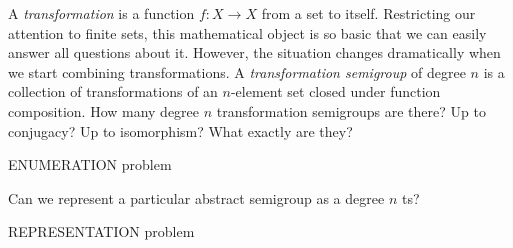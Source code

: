\documentclass{amsart}
\begin{document}
A \emph{transformation} is a function $f:X\rightarrow X$ from a set to itself.
Restricting our attention to finite sets, this mathematical object is so basic that we can easily answer all questions about it.
However, the situation changes dramatically when we start combining transformations.
A \emph{transformation semigroup} of degree $n$ is a collection of transformations of an $n$-element set closed under function composition.
How many degree $n$ transformation semigroups are there? Up to conjugacy? Up to isomorphism? What exactly are they?

ENUMERATION problem

Can we represent a particular abstract semigroup as a degree $n$ ts?

REPRESENTATION problem
\end{document}
